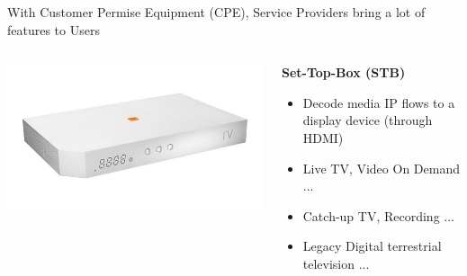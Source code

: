 \documentclass[a4paper]{beamer}
\begin{document}
\begin{frame}{With Customer Permise Equipment (CPE), Service Providers bring a lot of features to Users}
										
	\begin{columns}[T] 
		\begin{column}[T]{0.25 \textwidth} 
			\includegraphics[width=\linewidth]{liveboxdec.png}
		\end{column}
																						
		\begin{column}[T]{0.75 \textwidth} %
																																	
																																		   
			\textbf{ Set-Top-Box (STB)}
			\begin{itemize}
				\item Decode media IP flows to a display device (through HDMI)
				\item Live TV, Video On Demand ...
				\item Catch-up TV, Recording ...
				\item Legacy Digital terrestrial television ...
			\end{itemize}
																																		     
																																	
		\end{column}
																						
	\end{columns}
											
											
											
\end{frame}

\end{document}
